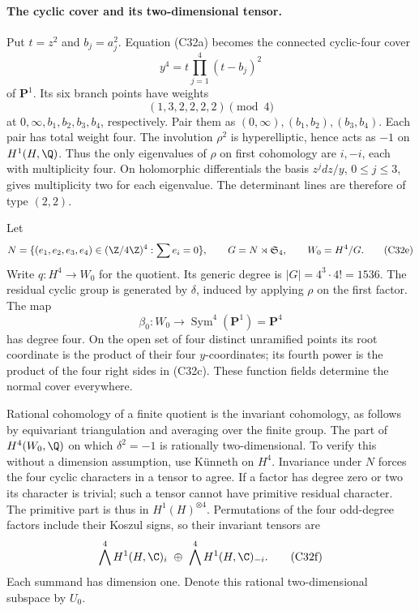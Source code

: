\paragraph{The cyclic cover and its two-dimensional tensor.}
Put $t=z^2$ and $b_j=a_j^2$.  Equation (C32a)
becomes the connected cyclic-four cover
\[
       y^4=t\prod_{j=1}^4(t-b_j)^2
                                                        \tag{C32c}
\]
of $\mathbf P^1$.  Its six branch points have
weights
\[
                 (1,3,2,2,2,2)\pmod4
                                                        \tag{C32d}
\]
at $0,\infty,b_1,b_2,b_3,b_4$, respectively.
Pair them as $(0,\infty),(b_1,b_2),(b_3,b_4)$.
Each pair has total weight four.  The involution
$\rho^2$ is hyperelliptic, hence acts as $-1$ on
$H^1(H,\Q)$.  Thus the only eigenvalues of $\rho$
on first cohomology are $i,-i$, each with multiplicity
four.  On holomorphic differentials the basis
$z^jdz/y$, $0\leq j\leq3$, gives multiplicity two
for each eigenvalue.  The determinant lines are
therefore of type $(2,2)$.

Let
\[
 N=\{(e_1,e_2,e_3,e_4)\in(\Z/4\Z)^4:
                                      \sum e_i=0\},
 \qquad G=N\rtimes\mathfrak S_4,
 \qquad W_0=H^4/G.
                                                        \tag{C32e}
\]
Write $q:H^4\to W_0$ for the quotient.  Its generic
degree is $|G|=4^3\cdot4!=1536$.  The residual
cyclic group is generated by $\delta$, induced by
applying $\rho$ on the first factor.  The map
\[
             \beta_0:W_0\longrightarrow
                  \operatorname{Sym}^4(\mathbf P^1)=\mathbf P^4
\]
has degree four.  On the open set of four distinct
unramified points its root coordinate is the product
of their four $y$-coordinates; its fourth power is
the product of the four right sides in (C32c).
These function fields determine the normal cover
everywhere.

Rational cohomology of a finite quotient is the
invariant cohomology, as follows by equivariant
triangulation and averaging over the finite group.
The part of $H^4(W_0,\Q)$ on which $\delta^2=-1$
is rationally two-dimensional.  To verify this
without a dimension assumption, use K\"unneth on
$H^4$.  Invariance under $N$ forces the four
cyclic characters in a tensor to agree.  If a
factor has degree zero or two its character is
trivial; such a tensor cannot have primitive
residual character.  The primitive part is thus
in $H^1(H)^{\otimes4}$.  Permutations of the four
odd-degree factors include their Koszul signs,
so their invariant tensors are
\[
     \bigwedge^4 H^1(H,\C)_i
          \ \oplus\ 
     \bigwedge^4 H^1(H,\C)_{-i}.
                                                        \tag{C32f}
\]
Each summand has dimension one.  Denote this
rational two-dimensional subspace by $U_0$.

